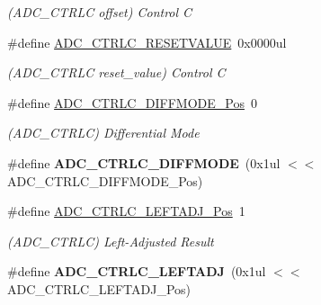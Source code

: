 \begin{DoxyCompactItemize}
\begin{DoxyCompactList}\small\item\em (A\+D\+C\+\_\+\+C\+T\+R\+L\+C offset) Control C \end{DoxyCompactList}\item 
\hypertarget{group___s_a_m_l21___a_d_c_ga15dc5bd512f61bb74c6cb69189f5bad2}{}\#define \hyperlink{group___s_a_m_l21___a_d_c_ga15dc5bd512f61bb74c6cb69189f5bad2}{A\+D\+C\+\_\+\+C\+T\+R\+L\+C\+\_\+\+R\+E\+S\+E\+T\+V\+A\+L\+U\+E}~0x0000ul\label{group___s_a_m_l21___a_d_c_ga15dc5bd512f61bb74c6cb69189f5bad2}

\begin{DoxyCompactList}\small\item\em (A\+D\+C\+\_\+\+C\+T\+R\+L\+C reset\+\_\+value) Control C \end{DoxyCompactList}\item 
\hypertarget{group___s_a_m_l21___a_d_c_ga18f1d6cc787061dd0640683f26a8f586}{}\#define \hyperlink{group___s_a_m_l21___a_d_c_ga18f1d6cc787061dd0640683f26a8f586}{A\+D\+C\+\_\+\+C\+T\+R\+L\+C\+\_\+\+D\+I\+F\+F\+M\+O\+D\+E\+\_\+\+Pos}~0\label{group___s_a_m_l21___a_d_c_ga18f1d6cc787061dd0640683f26a8f586}

\begin{DoxyCompactList}\small\item\em (A\+D\+C\+\_\+\+C\+T\+R\+L\+C) Differential Mode \end{DoxyCompactList}\item 
\hypertarget{group___s_a_m_l21___a_d_c_ga8302eecff6a0c7ff4dad2501fed7f5fd}{}\#define {\bfseries A\+D\+C\+\_\+\+C\+T\+R\+L\+C\+\_\+\+D\+I\+F\+F\+M\+O\+D\+E}~(0x1ul $<$$<$ A\+D\+C\+\_\+\+C\+T\+R\+L\+C\+\_\+\+D\+I\+F\+F\+M\+O\+D\+E\+\_\+\+Pos)\label{group___s_a_m_l21___a_d_c_ga8302eecff6a0c7ff4dad2501fed7f5fd}

\item 
\hypertarget{group___s_a_m_l21___a_d_c_gaa6495f4c70abfb8a1b5f5ad31eb29666}{}\#define \hyperlink{group___s_a_m_l21___a_d_c_gaa6495f4c70abfb8a1b5f5ad31eb29666}{A\+D\+C\+\_\+\+C\+T\+R\+L\+C\+\_\+\+L\+E\+F\+T\+A\+D\+J\+\_\+\+Pos}~1\label{group___s_a_m_l21___a_d_c_gaa6495f4c70abfb8a1b5f5ad31eb29666}

\begin{DoxyCompactList}\small\item\em (A\+D\+C\+\_\+\+C\+T\+R\+L\+C) Left-\/\+Adjusted Result \end{DoxyCompactList}\item 
\hypertarget{group___s_a_m_l21___a_d_c_ga350476fcdb6554500801cb89e24ca8c6}{}\#define {\bfseries A\+D\+C\+\_\+\+C\+T\+R\+L\+C\+\_\+\+L\+E\+F\+T\+A\+D\+J}~(0x1ul $<$$<$ A\+D\+C\+\_\+\+C\+T\+R\+L\+C\+\_\+\+L\+E\+F\+T\+A\+D\+J\+\_\+\+Pos)\label{group___s_a_m_l21___a_d_c_ga350476fcdb6554500801cb89e24ca8c6}


\end{DoxyCompactItemize}
